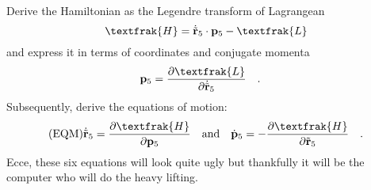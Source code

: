 \documentclass[]{article}
\begin{document}
\begin{bclogo}[logo={\bccrayon},arrondi=0.1]{}
Derive the Hamiltonian as the Legendre transform of Lagrangean 
$$
\textfrak{H} = \dot{\tilde{\vb{r}}}_5\cdot\vb{p}_5 - \textfrak{L}
$$
and express it in terms of
coordinates and conjugate momenta
$$
\vb{p}_5 = \frac{\partial \textfrak{L}}{\partial \dot{\tilde{\vb{r}}}_5}
\qq{.}
$$
Subsequently, derive the equations of motion:
\begin{align}\tag{EQM}
    \dot{\tilde{\vb{r}}}_5 &= \frac{\partial \textfrak{H}}{\partial \vb{p}_5}
    \qq{and}
    \dot{\vb{p}}_5 = -\frac{\partial \textfrak{H}}{\partial \tilde{\vb{r}}_5}
    \qq{.}
\end{align}
Ecce, these six equations will look quite ugly but thankfully it will be the computer
who will do the heavy lifting. 
\end{bclogo}

\newpage
\printnomenclature

\end{document}
